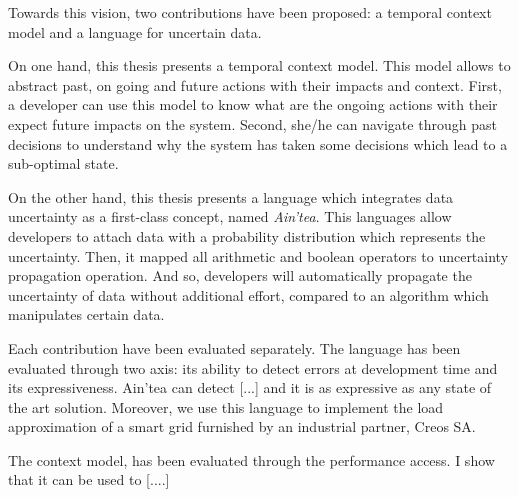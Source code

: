 \bigskip
Towards this vision, two contributions have been proposed: a temporal context model and a language for uncertain data.

On one hand, this thesis presents a temporal context model.
This model allows to abstract past, on going and future actions with their impacts and context.
First, a developer can use this model to know what are the ongoing actions with their expect future impacts on the system.
Second, she/he can navigate through past decisions to understand why the system has taken some decisions which lead to a sub-optimal state.

On the other hand, this thesis presents a language which integrates data uncertainty as a first-class concept, named \textit{Ain'tea}.
This languages allow developers to attach data with a probability distribution which represents the uncertainty.
Then, it mapped all arithmetic and boolean operators to uncertainty propagation operation. 
And so, developers will automatically propagate the uncertainty of data without additional effort, compared to an algorithm which manipulates certain data.

\bigskip
Each contribution have been evaluated separately. 
The language has been evaluated through two axis: its ability to detect errors at development time and its expressiveness.
Ain'tea can detect [...] and it is as expressive as any state of the art solution.
Moreover, we use this language to implement the load approximation of a smart grid furnished by an industrial partner, Creos SA.

The context model, has been evaluated through the performance access.
I show that it can be used to [....]


\bigskip
{}



